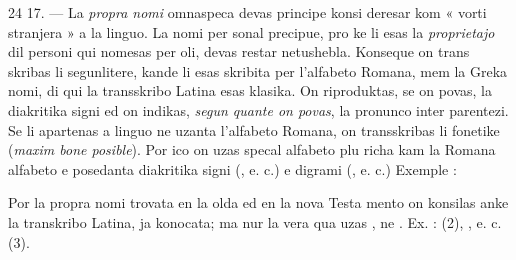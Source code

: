 \begin{VUpage}[28]{24}
17. --- La \textit{propra nomi} omnaspeca devas principe konsi\cc
deresar kom « vorti stranjera » a la linguo. La nomi per\cc
sonal precipue, pro ke li esas la \textit{proprietajo} dil personi qui\nl
nomesas per oli, devas restar netushebla. Konseque on trans\cc
skribas li segunlitere, kande li esas skribita per l'alfabeto\nl
Romana, mem la Greka nomi, di qui la transskribo Latina\nl
esas klasika. On riproduktas, se on povas, la diakritika\nl
signi ed on indikas, \textit{segun quante on povas}, la pronunco\nl
inter parentezi. Se li apartenas a linguo ne uzanta l'alfabeto\nl
Romana, on transskribas li fonetike (\textit{maxim bone posible}).\nl
Por ico on uzas specal alfabeto plu richa kam la Romana\nl
alfabeto e posedanta diakritika signi (, e. c.) e digrami\nl
(, e. c.) Exemple : \cc
{}\nl
{}\nl
{}

Por la propra nomi trovata en la olda ed en la nova Testa\cc
mento on konsilas anke la transkribo Latina, ja konocata;\nl
ma nur la vera qua uzas , ne . Ex. : \nl
{} (2), \nl
{}, e. c. (3).
\end{VUpage}

